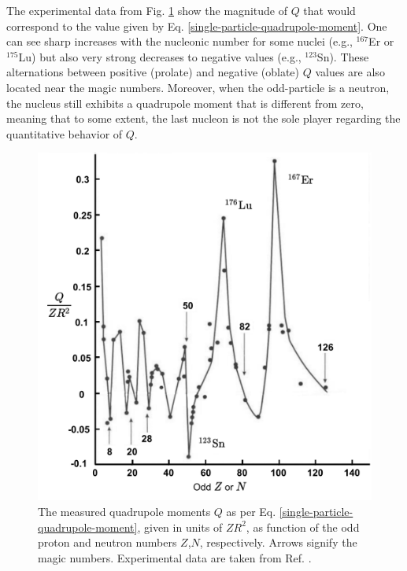The experimental data from Fig. \ref{experimental-Q-odd-nuclei} show the magnitude of $Q$ that would correspond to the value given by Eq. \ref{single-particle-quadrupole-moment}. One can see sharp increases with the nucleonic number for some nuclei (e.g., $^{167}$Er or $^{175}$Lu) but also very strong decreases to negative values (e.g., $^{123}$Sn). These alternations between positive (prolate) and negative (oblate) $Q$ values are also located near the magic numbers. Moreover, when the odd-particle is a neutron, the nucleus still exhibits a quadrupole moment that is different from zero, meaning that to some extent, the last nucleon is not the sole player regarding the quantitative behavior of $Q$.
\begin{figure}
    \centering
    \includegraphics[scale=0.55]{Chapters/Figures/Exp_quadrupoleMoments.pdf}
    \caption{The measured quadrupole moments $Q$ as per Eq. \ref{single-particle-quadrupole-moment}, given in units of $ZR^2$, as function of the odd proton and neutron numbers $Z$,$N$, respectively. Arrows signify the magic numbers. Experimental data are taken from Ref. \cite{bertulani2007nuclear}.}
    \label{experimental-Q-odd-nuclei}
\end{figure}

